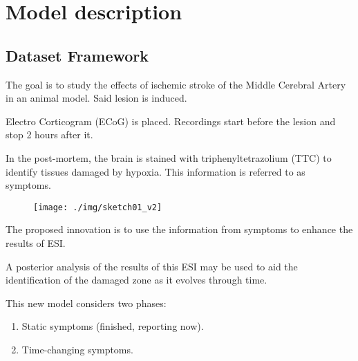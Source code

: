 \chapter{Model description}
%
%
%

\section{Dataset Framework}
The goal is to study the effects of
ischemic stroke of the Middle Cerebral Artery in an animal
model. 
Said lesion is induced.

Electro Corticogram (ECoG) is placed. Recordings start before the lesion and stop 2 hours after it.

In the post-mortem, the brain is stained with
triphenyltetrazolium (TTC)
to identify tissues damaged by hypoxia. This information is referred to as  {symptoms}.

\begin{figure}
\centering
\texttt{[image: ./img/sketch01\_v2]}
\end{figure}
 

The proposed innovation is to use the information from {symptoms} to enhance the results of ESI.

A posterior analysis of the results of this ESI may be used to aid the identification of the damaged zone as it evolves through time.

This new model considers two phases:
\begin{enumerate}
    \item Static symptoms (finished, reporting now).
    \item Time-changing symptoms.
\end{enumerate}
 



